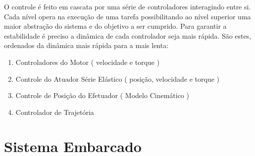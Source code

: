O controle é feito em cascata por uma série de controladores interagindo entre si. Cada nível opera na execução de uma tarefa possibilitando ao nível superior uma maior abstração do sistema e do objetivo a ser cumprido. Para garantir a estabilidade é preciso a dinâmica de cada controlador seja mais rápida. São estes, ordenados da dinâmica mais rápida para a mais lenta:

\begin{enumerate}
    \item Controladores do Motor ( velocidade e torque )
    \item Controle do Atuador Série Elástico ( posição, velocidade e torque )
    \item Controle de Posição do Efetuador ( Modelo Cinemático )
    \item Controlador de Trajetória
\end{enumerate}







\section{Sistema Embarcado}

